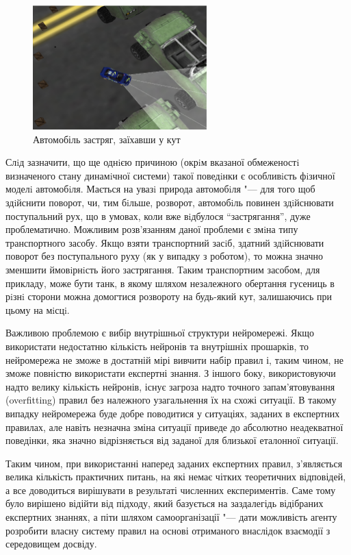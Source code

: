 \begin{figure}
	\centering
    \includegraphics[width=0.6\textwidth]{stuck.png}
	\caption{Автомобіль застряг, заїхавши у кут}
	\label{car_stuck}
\end{figure}


Слiд зазначити, що ще однiєю причиною (окрiм вказаної обмеженостi визначеного стану динамiчної системи) такої поведiнки є особливiсть фiзичної моделi автомобiля. Мається на увазi природа автомобiля "--- для того щоб здiйснити поворот, чи, тим бiльше, розворот, автомобiль повинен здiйснювати поступальний рух, що в умовах, коли вже вiдбулося ``застрягання'', дуже проблематично. Можливим розв’язанням даної проблеми є змiна типу транспортного засобу. Якщо взяти транспортний засiб, здатний здiйснювати поворот без поступального руху (як у випадку з роботом), то можна значно зменшити ймовiрнiсть його застрягання. Таким транспортним засобом, для прикладу, може бути танк, в якому шляхом незалежного обертання гусениць в рiзнi сторони можна домогтися розвороту на будь-який кут, залишаючись при цьому на мiсцi.

Важливою проблемою є вибір внутрішньої структури нейромережі. Якщо використати недостатню кількість нейронів та внутрішніх прошарків, то нейромережа не зможе в достатній мірі вивчити набір правил і, таким чином, не зможе повністю використати експертні знання. З іншого боку, використовуючи надто велику кількість нейронів, існує загроза надто точного запам'ятовування (overfitting) правил без належного узагальнення їх на схожі ситуації. В такому випадку нейромережа буде добре поводитися у ситуаціях, заданих в експертних правилах, але навіть незначна зміна ситуації приведе до абсолютно неадекватної поведінки, яка значно відрізняється від заданої для близької еталонної ситуації.

Таким чином, при використанні наперед заданих експертних правил, з'являється велика кількість практичних питань, на які немає чітких теоретичних відповідей, а все доводиться вирішувати в результаті численних експериментів. Саме тому було вирішено відійти від підходу, який базується на заздалегідь відібраних експертних знаннях, а піти шляхом самоорганізації "--- дати можливість агенту розробити власну систему правил на основі отриманого внаслідок взаємодії з середовищем досвіду.

